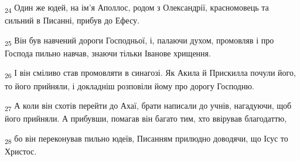 \begin{tcolorbox}
\textsubscript{24} Один же юдей, на ім'я Аполлос, родом з Олександрії, красномовець та сильний в Писанні, прибув до Ефесу.
\end{tcolorbox}
\begin{tcolorbox}
\textsubscript{25} Він був навчений дороги Господньої, і, палаючи духом, промовляв і про Господа пильно навчав, знаючи тільки Іванове хрищення.
\end{tcolorbox}
\begin{tcolorbox}
\textsubscript{26} І він сміливо став промовляти в синагозі. Як Акила й Прискилла почули його, то його прийняли, і докладніш розповіли йому про дорогу Господню.
\end{tcolorbox}
\begin{tcolorbox}
\textsubscript{27} А коли він схотів перейти до Ахаї, брати написали до учнів, нагадуючи, щоб його прийняли. А прибувши, помагав він багато тим, хто ввірував благодаттю,
\end{tcolorbox}
\begin{tcolorbox}
\textsubscript{28} бо він переконував пильно юдеїв, Писанням прилюдно доводячи, що Ісус то Христос.
\end{tcolorbox}
